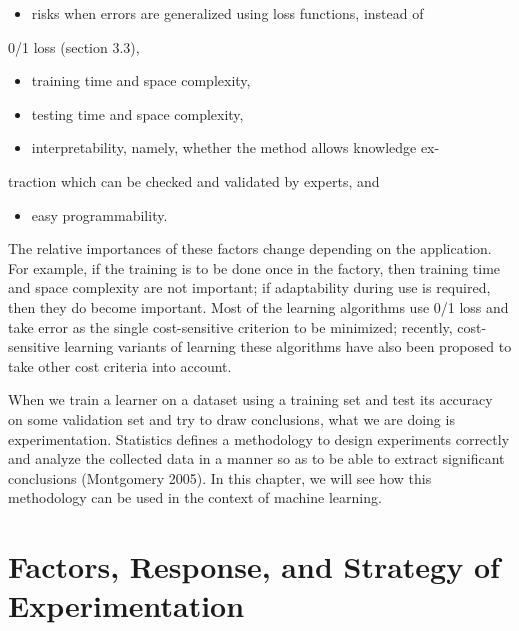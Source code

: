 \begin{itemize}
\item risks when errors are generalized using loss functions, instead of
\end{itemize}

0/1 loss (section 3.3),

\begin{itemize}
\item training time and space complexity,
\end{itemize}

\begin{itemize}
\item testing time and space complexity,
\end{itemize}

\begin{itemize}
\item interpretability, namely, whether the method allows knowledge ex-
\end{itemize}

traction which can be checked and validated by experts, and

\begin{itemize}
\item easy programmability.
\end{itemize}

The relative importances of these factors change depending on the application. For example, if the training is to be done once in the factory, then training time and space complexity are not important; if adaptability during use is required, then they do become important. Most of the learning algorithms use 0/1 loss and take error as the single cost-sensitive criterion to be minimized; recently, cost-sensitive learning variants of learning these algorithms have also been proposed to take other cost criteria into account.

When we train a learner on a dataset using a training set and test its accuracy on some validation set and try to draw conclusions, what we are doing is experimentation. Statistics defines a methodology to design experiments correctly and analyze the collected data in a manner so as to be able to extract significant conclusions (Montgomery 2005). In this chapter, we will see how this methodology can be used in the context of machine learning.

\section{Factors, Response, and Strategy of Experimentation}

